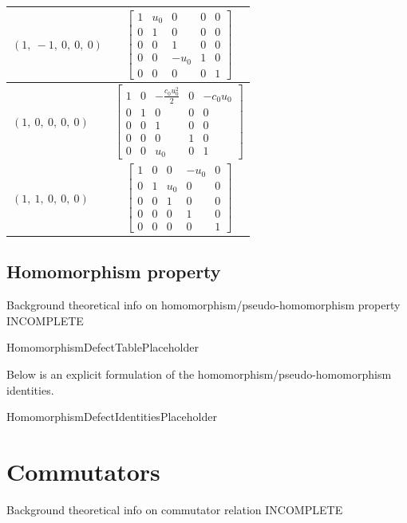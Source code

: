 \documentclass[11pt]{article}
\newcommand{\noi}{\noindent}
\theoremstyle{definition}
\begin{document}
\begin{tabular}{|l|c|}
    \hline
    $\left( 1, \  -1, \  0, \  0, \  0\right)$ & $\left[\begin{matrix}1 & u_{0} & 0 & 0 & 0\\0 & 1 & 0 & 0 & 0\\0 & 0 & 1 & 0 & 0\\0 & 0 & - u_{0} & 1 & 0\\0 & 0 & 0 & 0 & 1\end{matrix}\right]$ \\
    \hline
    $\left( 1, \  0, \  0, \  0, \  0\right)$ & $\left[\begin{matrix}1 & 0 & - \frac{c_{0} u_{0}^{2}}{2} & 0 & - c_{0} u_{0}\\0 & 1 & 0 & 0 & 0\\0 & 0 & 1 & 0 & 0\\0 & 0 & 0 & 1 & 0\\0 & 0 & u_{0} & 0 & 1\end{matrix}\right]$ \\
    \hline
    $\left( 1, \  1, \  0, \  0, \  0\right)$ & $\left[\begin{matrix}1 & 0 & 0 & - u_{0} & 0\\0 & 1 & u_{0} & 0 & 0\\0 & 0 & 1 & 0 & 0\\0 & 0 & 0 & 1 & 0\\0 & 0 & 0 & 0 & 1\end{matrix}\right]$ \\
    \hline
\end{tabular}


\subsection{Homomorphism property}

\noi Background theoretical info on homomorphism/pseudo-homomorphism property INCOMPLETE

\bigskip

HomomorphismDefectTablePlaceholder

\noi Below is an explicit formulation of the homomorphism/pseudo-homomorphism identities.

\bigskip

HomomorphismDefectIdentitiesPlaceholder

\newpage
\section{Commutators}

\noi Background theoretical info on commutator relation INCOMPLETE
\end{document}
